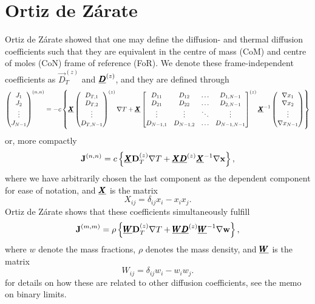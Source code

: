 \section{Ortiz de Zárate}

Ortiz de Zárate showed that one may define the diffusion- and thermal diffusion coefficients such that they are equivalent in the centre of mass (CoM) and centre of moles (CoN) frame of reference (FoR).\cite{ortiz2019definition} We denote these frame-independent coefficients as $\Vec{D}_T^{(z)}$ and $\underline{\pmb{D}}^{(z)}$, and they are defined through
\begin{equation}
    \begin{pmatrix}J_1 \\ J_2 \\ \vdots \\ J_{N-1} \end{pmatrix}^{(n, n)} = - c\left\{
    \underline{\pmb{X}}
    \begin{pmatrix}
    D_{T,1} \\ D_{T,2} \\ \vdots \\ D_{T,N-1}    
    \end{pmatrix}^{(z)} \nabla T +
    \underline{\pmb{X}}
    \begin{bmatrix}
    D_{11} & D_{12} & \hdots & D_{1,N-1} \\
    D_{21} & D_{22} & \hdots & D_{2,N-1} \\
    \vdots & \vdots & \ddots & \vdots \\
    D_{N-1,1} & D_{N-1,2} & \hdots & D_{N-1,N-1}
    \end{bmatrix}^{(z)}
    \underline{\pmb{X}}^{-1}
    \begin{pmatrix}\nabla x_1 \\ \nabla x_2 \\ \vdots \\ \nabla x_{N-1} \end{pmatrix}
    \right\}
    \label{eq:zarate_definition}
\end{equation}
or, more compactly
\begin{equation}
    \boldsymbol{\mathrm{J}}^{(n, n)} = c \left\{ \underline{\pmb{X}} \boldsymbol{\mathrm{D}}_T^{(z)} \nabla T + \underline{\pmb{X}} \underline{\pmb{D}}^{(z)} \underline{\pmb{X}}^{-1} \nabla \boldsymbol{\mathrm{x}} \right\},
\end{equation}
where we have arbitrarily chosen the last component as the dependent component for ease of notation, and $\underline{\pmb{X}}$ is the matrix
\begin{equation}
    X_{ij} = \delta_{ij} x_i - x_i x_j.
\end{equation}
Ortiz de Zárate shows that these coefficients simultaneously fulfill
\begin{equation}
    \boldsymbol{\mathrm{J}}^{(m, m)} = \rho \left\{ \underline{\pmb{W}} \boldsymbol{\mathrm{D}}_T^{(z)} \nabla T + \underline{\pmb{W}} \underline{\pmb{D}}^{(z)} \underline{\pmb{W}}^{-1} \nabla \boldsymbol{\mathrm{w}} \right\},
\end{equation}
where $w$ denote the mass fractions, $\rho$ denotes the mass density, and $\underline{\pmb{W}}$ is the matrix
\begin{equation}
    W_{ij} = \delta_{ij} w_i - w_i w_j.
\end{equation}
for details on how these are related to other diffusion coefficients, see the memo on binary limits.

